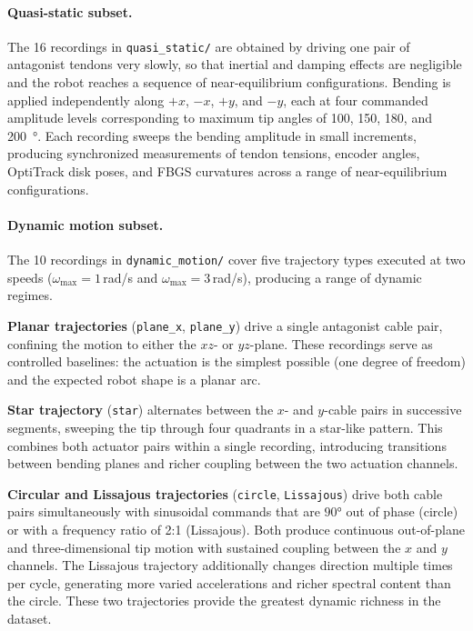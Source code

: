 \documentclass[14pt, a4paper]{article}
\begin{document}
\paragraph{Quasi-static subset.}
The 16 recordings in \texttt{quasi\_static/} are obtained by driving one pair of antagonist tendons very slowly, so that inertial and damping effects are negligible and the robot reaches a sequence of near-equilibrium configurations.
Bending is applied independently along $+x$, $-x$, $+y$, and $-y$, each at four commanded amplitude levels corresponding to maximum tip angles of 100, 150, 180, and \SI{200}{\degree}.
Each recording sweeps the bending amplitude in small increments, producing synchronized measurements of tendon tensions, encoder angles, OptiTrack disk poses, and FBGS curvatures across a range of near-equilibrium configurations.

\paragraph{Dynamic motion subset.}
The 10 recordings in \texttt{dynamic\_motion/} cover five trajectory types executed at two speeds ($\omega_{\max} = 1$\,rad/s and $\omega_{\max} = 3$\,rad/s), producing a range of dynamic regimes.

\textbf{Planar trajectories} (\texttt{plane\_x}, \texttt{plane\_y}) drive a single antagonist cable pair, confining the motion to either the $xz$- or $yz$-plane.
These recordings serve as controlled baselines: the actuation is the simplest possible (one degree of freedom) and the expected robot shape is a planar arc.

\textbf{Star trajectory} (\texttt{star}) alternates between the $x$- and $y$-cable pairs in successive segments, sweeping the tip through four quadrants in a star-like pattern.
This combines both actuator pairs within a single recording, introducing transitions between bending planes and richer coupling between the two actuation channels.

\textbf{Circular and Lissajous trajectories} (\texttt{circle}, \texttt{Lissajous}) drive both cable pairs simultaneously with sinusoidal commands that are $90°$ out of phase (circle) or with a frequency ratio of 2:1 (Lissajous).
Both produce continuous out-of-plane and three-dimensional tip motion with sustained coupling between the $x$ and $y$ channels.
The Lissajous trajectory additionally changes direction multiple times per cycle, generating more varied accelerations and richer spectral content than the circle.
These two trajectories provide the greatest dynamic richness in the dataset.
\end{document}
